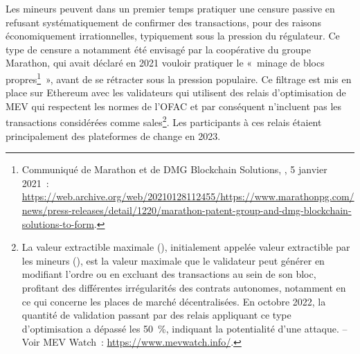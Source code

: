 Les mineurs peuvent dans un premier temps pratiquer une censure passive en refusant systématiquement de confirmer des transactions, pour des raisons économiquement irrationnelles, typiquement sous la pression du régulateur. Ce type de censure a notamment été envisagé par la coopérative du groupe Marathon, qui avait déclaré en 2021 vouloir pratiquer le «~minage de blocs propres\footnote{Communiqué de Marathon et de DMG Blockchain Solutions, , 5 janvier 2021~: \url{https://web.archive.org/web/20210128112455/https://www.marathonpg.com/news/press-releases/detail/1220/marathon-patent-group-and-dmg-blockchain-solutions-to-form}.}~», avant de se rétracter sous la pression populaire. Ce filtrage est mis en place sur Ethereum avec les validateurs qui utilisent des relais d'optimisation de MEV qui respectent les normes de l'OFAC et par conséquent n'incluent pas les transactions considérées comme sales\footnote{La valeur extractible maximale (), initialement appelée valeur extractible par les mineurs (), est la valeur maximale que le validateur peut générer en modifiant l'ordre ou en excluant des transactions au sein de son bloc, profitant des différentes irrégularités des contrats autonomes, notamment en ce qui concerne les places de marché décentralisées. En octobre 2022, la quantité de validation passant par des relais appliquant ce type d'optimisation a dépassé les 50~\%, indiquant la potentialité d'une attaque. -- Voir MEV Watch~: \url{https://www.mevwatch.info/}.}. Les participants à ces relais étaient principalement des plateformes de change en 2023. %

